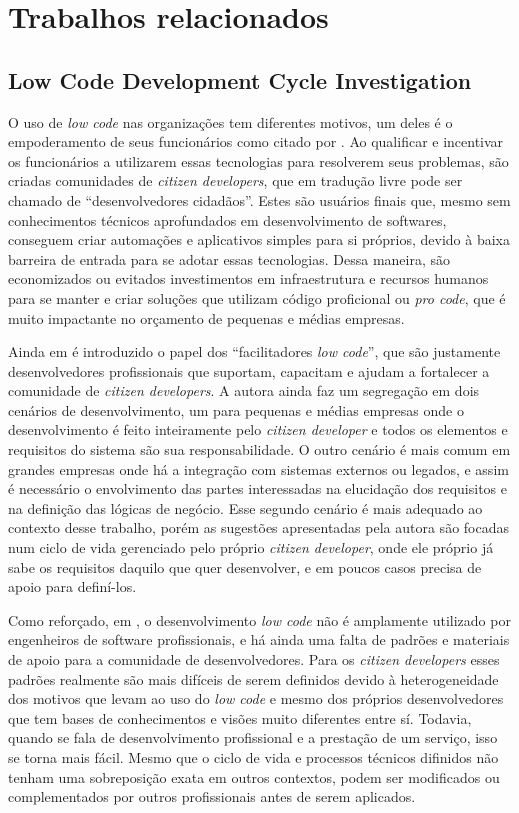 	{\color{blue}
	\section{Trabalhos relacionados}
		
		\subsection{Low Code Development Cycle Investigation}
		O uso de \textit{low code} nas organizações tem diferentes motivos, um deles é o empoderamento de seus funcionários como citado por \cite{LowCodeLifeCicle}. 
		Ao qualificar e incentivar os funcionários a utilizarem essas tecnologias para resolverem seus problemas, são criadas comunidades de \textit{citizen developers}, que em tradução livre pode ser 
		chamado de ``desenvolvedores cidadãos''. Estes são usuários finais que, mesmo sem conhecimentos técnicos aprofundados em desenvolvimento de softwares, conseguem criar automações e aplicativos 
		simples para si próprios, devido à baixa barreira de entrada para se adotar essas tecnologias. Dessa maneira, são economizados ou evitados investimentos em
		infraestrutura e recursos humanos para se manter e criar soluções que utilizam código proficional ou \textit{pro code}, que é muito impactante no orçamento de pequenas e médias empresas.

		Ainda em \cite{LowCodeLifeCicle} é introduzido o papel dos ``facilitadores \textit{low code}'', que são justamente desenvolvedores profissionais que suportam, capacitam e ajudam a
		fortalecer a comunidade de \textit{citizen developers}. A autora ainda faz um segregação em dois cenários de desenvolvimento, um para pequenas e médias empresas onde o desenvolvimento
		é feito inteiramente pelo \textit{citizen developer} e todos os elementos e requisitos do sistema são sua responsabilidade. O outro cenário é mais comum em grandes empresas onde há 
		a integração com sistemas externos ou legados, e assim é necessário o envolvimento das partes interessadas na elucidação dos requisitos e na definição das lógicas de negócio. Esse
		segundo cenário é mais adequado ao contexto desse trabalho, porém as sugestões apresentadas pela autora são focadas num ciclo de vida gerenciado pelo próprio \textit{citizen developer},
		onde ele próprio já sabe os requisitos daquilo que quer desenvolver, e em poucos casos precisa de apoio para definí-los.

		Como reforçado, em \cite{LowCodeLifeCicle}, o desenvolvimento \textit{low code} não é amplamente utilizado por engenheiros de software profissionais, e há ainda uma falta de padrões e
		materiais de apoio para a comunidade de desenvolvedores. Para os \textit{citizen developers} esses padrões realmente são mais difíceis de serem definidos devido à heterogeneidade dos
		motivos que levam ao uso do \textit{low code} e mesmo dos próprios desenvolvedores que tem bases de conhecimentos e visões muito diferentes entre sí. Todavia, quando se fala de desenvolvimento
		profissional e a prestação de um serviço, isso se torna mais fácil. Mesmo que o ciclo de vida e processos técnicos difinidos não tenham uma sobreposição exata em outros contextos, podem 
		ser modificados ou complementados por outros profissionais antes de serem aplicados.
		
}
